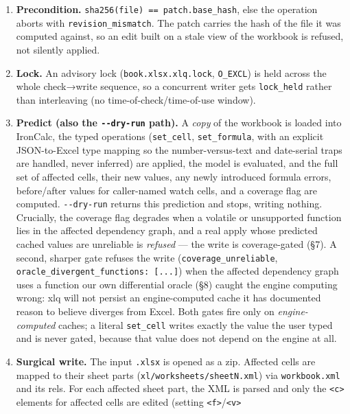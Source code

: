 \documentclass[
]{article}
\providecommand{\tightlist}{%
  \setlength{\itemsep}{0pt}\setlength{\parskip}{0pt}}
\begin{document}
\begin{enumerate}
\def\labelenumi{\arabic{enumi}.}
\tightlist
\item
  \textbf{Precondition.} \texttt{sha256(file)\ ==\ patch.base\_hash},
  else the operation aborts with \texttt{revision\_mismatch}. The patch
  carries the hash of the file it was computed against, so an edit built
  on a stale view of the workbook is refused, not silently applied.
\item
  \textbf{Lock.} An advisory lock (\texttt{book.xlsx.xlq.lock},
  \texttt{O\_EXCL}) is held across the whole check→write sequence, so a
  concurrent writer gets \texttt{lock\_held} rather than interleaving
  (no time-of-check/time-of-use window).
\item
  \textbf{Predict (also the \texttt{-\/-dry-run} path).} A \emph{copy}
  of the workbook is loaded into IronCalc, the typed operations
  (\texttt{set\_cell}, \texttt{set\_formula}, with an explicit
  JSON-to-Excel type mapping so the number-versus-text and date-serial
  traps are handled, never inferred) are applied, the model is
  evaluated, and the full set of affected cells, their new values, any
  newly introduced formula errors, before/after values for caller-named
  watch cells, and a coverage flag are computed. \texttt{-\/-dry-run}
  returns this prediction and stops, writing nothing. Crucially, the
  coverage flag degrades when a volatile or unsupported function lies in
  the affected dependency graph, and a real apply whose predicted cached
  values are unreliable is \emph{refused} --- the write is
  coverage-gated (§7). A second, sharper gate refuses the write
  (\texttt{coverage\_unreliable},
  \texttt{oracle\_divergent\_functions:\ {[}...{]}}) when the affected
  dependency graph uses a function our own differential oracle (§8)
  caught the engine computing wrong: xlq will not persist an
  engine-computed cache it has documented reason to believe diverges
  from Excel. Both gates fire only on \emph{engine-computed} caches; a
  literal \texttt{set\_cell} writes exactly the value the user typed and
  is never gated, because that value does not depend on the engine at
  all.
\item
  \textbf{Surgical write.} The input \texttt{.xlsx} is opened as a zip.
  Affected cells are mapped to their sheet parts
  (\texttt{xl/worksheets/sheetN.xml}) via \texttt{workbook.xml} and its
  rels. For each affected sheet part, the XML is parsed and only the
  \texttt{\textless{}c\textgreater{}} elements for affected cells are
  edited (setting
  \texttt{\textless{}f\textgreater{}}/\texttt{\textless{}v\textgreater{}}

\end{enumerate}
\end{document}
